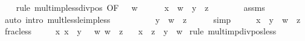 \begin{isabellebody}
\ \ \isamarkupfalse%
\ {\isacharparenleft}{\kern0pt}rule\ mult{\isacharunderscore}{\kern0pt}imp{\isacharunderscore}{\kern0pt}less{\isacharunderscore}{\kern0pt}div{\isacharunderscore}{\kern0pt}pos\ {\isacharbrackleft}{\kern0pt}OF\ {\isacartoucheopen}{}\ {\isacharless}{\kern0pt}\ w{\isacartoucheclose}{\isacharbrackright}{\kern0pt}{\isacharparenright}{\kern0pt}\isanewline
\ \ \ \ \isamarkupfalse%
\ {\isachardoublequoteopen}x\ {\isacharasterisk}{\kern0pt}\ w\ {\isacharless}{\kern0pt}\ y\ {\isacharasterisk}{\kern0pt}\ z{\isachardoublequoteclose}\isanewline
\ \ \ \ \ \ \isamarkupfalse%
\ assms\ \isamarkupfalse%
\ {\isacharparenleft}{\kern0pt}auto\ intro{\isacharcolon}{\kern0pt}\ mult{\isacharunderscore}{\kern0pt}less{\isacharunderscore}{\kern0pt}le{\isacharunderscore}{\kern0pt}imp{\isacharunderscore}{\kern0pt}less{\isacharparenright}{\kern0pt}\isanewline
\ \ \isamarkupfalse%
\isanewline
\ \ \isamarkupfalse%
\ \isamarkupfalse%
\ {\isachardoublequoteopen}{\isachardot}{\kern0pt}{\isachardot}{\kern0pt}{\isachardot}{\kern0pt}\ {\isacharequal}{\kern0pt}\ y\ {\isacharslash}{\kern0pt}\ w\ {\isacharasterisk}{\kern0pt}\ z{\isachardoublequoteclose}\isanewline
\ \ \ \ \isamarkupfalse%
\ simp\isanewline
\ \ \isamarkupfalse%
\ \isamarkupfalse%
\ {\isachardoublequoteopen}x\ {\isacharless}{\kern0pt}\ y\ {\isacharslash}{\kern0pt}\ w\ {\isacharasterisk}{\kern0pt}\ z{\isachardoublequoteclose}\ \isacommand{{\isachardot}{\kern0pt}}\isamarkupfalse%
\isanewline
{}\isamarkupfalse%
%
\endisatagproof
{\isafoldproof}%
%
\isadelimproof
\isanewline
%
\endisadelimproof
\isanewline
{}\isamarkupfalse%
\ frac{\isacharunderscore}{\kern0pt}less{}{\isacharcolon}{\kern0pt}\isanewline
\ \ \ {\isachardoublequoteopen}{}\ {\isacharless}{\kern0pt}\ x{\isachardoublequoteclose}\ {\isachardoublequoteopen}x\ {\isasymle}\ y{\isachardoublequoteclose}\ {\isachardoublequoteopen}{}\ {\isacharless}{\kern0pt}\ w{\isachardoublequoteclose}\ {\isachardoublequoteopen}w\ {\isacharless}{\kern0pt}\ z{\isachardoublequoteclose}\isanewline
\ \ \ {\isachardoublequoteopen}x\ {\isacharslash}{\kern0pt}\ z\ {\isacharless}{\kern0pt}\ y\ {\isacharslash}{\kern0pt}\ w{\isachardoublequoteclose}\isanewline
%
\isadelimproof
%
\endisadelimproof
%
\isatagproof
{}\isamarkupfalse%
\ {\isacharparenleft}{\kern0pt}rule\ mult{\isacharunderscore}{\kern0pt}imp{\isacharunderscore}{\kern0pt}div{\isacharunderscore}{\kern0pt}pos{\isacharunderscore}{\kern0pt}less{\isacharparenright}{\kern0pt}\isanewline

\end{isabellebody}
